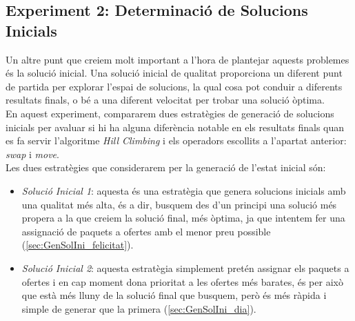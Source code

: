 \documentclass[a4paper]{article}
\begin{document}
	\subsection{Experiment 2: Determinació de Solucions Inicials}
	\label{sec:exp2}
	
	Un altre punt que creiem molt important a l'hora de plantejar aquests problemes és la solució inicial. Una solució inicial de qualitat proporciona un diferent punt de partida per explorar l'espai de solucions, la qual cosa pot conduir a diferents resultats finals, o bé a una diferent velocitat per trobar una solució òptima. \\
	
	En aquest experiment, compararem dues estratègies de generació de solucions inicials per avaluar si hi ha alguna diferència notable en els resultats finals quan es fa servir l'algoritme \textit{Hill Climbing} i els operadors escollits a l'apartat anterior: \textit{swap} i \textit{move}.\\
	
	Les dues estratègies que considerarem per la generació de l'estat inicial són:
	
	\begin{itemize}
		\item \emph{Solució Inicial 1}: aquesta és una estratègia que genera solucions inicials amb una qualitat més alta, és a dir, busquem des d'un principi una solució més propera a la que creiem la solució final, més òptima, ja que intentem fer una assignació de paquets a ofertes amb el menor preu possible (\ref{sec:GenSolIni_felicitat}).
		
		\item \emph{Solució Inicial 2}: aquesta estratègia simplement pretén assignar els paquets a ofertes i en cap moment dona prioritat a les ofertes més barates, és per això que està més lluny de la solució final que busquem, però és més ràpida i simple de generar que la primera (\ref{sec:GenSolIni_dia}).
	\end{itemize}
	
\end{document}
